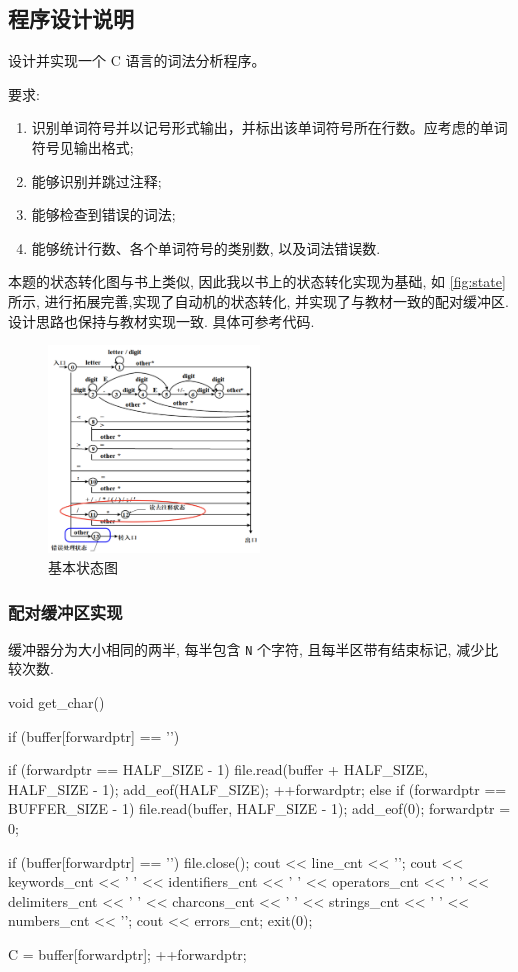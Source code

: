 \subsection{程序设计说明}

设计并实现一个 C 语言的词法分析程序。

要求: \begin{enumerate}
    \item 识别单词符号并以记号形式输出，并标出该单词符号所在行数。应考虑的单词符号见输出格式;
    \item 能够识别并跳过注释;
    \item 能够检查到错误的词法;
    \item 能够统计行数、各个单词符号的类别数, 以及词法错误数.
\end{enumerate}

本题的状态转化图与书上类似, 因此我以书上的状态转化实现为基础, 如 \autoref{fig:state} 所示, 进行拓展完善,实现了自动机的状态转化, 并实现了与教材一致的配对缓冲区. 设计思路也保持与教材实现一致. 具体可参考代码. \begin{figure}[htbp]
    \centering
    \includegraphics[width=0.5\textwidth]{images/state.png}
    \caption{基本状态图}
    \label{fig:state}
\end{figure}

\subsubsection{配对缓冲区实现}
缓冲器分为大小相同的两半, 每半包含 \texttt{N} 个字符, 且每半区带有结束标记, 减少比较次数.
\begin{cppcode}
void get_char()
{
    if (buffer[forwardptr] == '\0') {
        if (forwardptr == HALF_SIZE - 1) {
            file.read(buffer + HALF_SIZE, HALF_SIZE - 1);
            add_eof(HALF_SIZE);
            ++forwardptr;
        } else if (forwardptr == BUFFER_SIZE - 1) {
            file.read(buffer, HALF_SIZE - 1);
            add_eof(0);
            forwardptr = 0;
        }

        if (buffer[forwardptr] == '\0') {
            file.close();
            cout << line_cnt << '\n';
            cout << keywords_cnt << ' ' << identifiers_cnt << ' ' << operators_cnt << ' ' << delimiters_cnt << ' ' << charcons_cnt << ' ' << strings_cnt << ' ' << numbers_cnt << '\n';
            cout << errors_cnt;
            exit(0);
        }
    }
    C = buffer[forwardptr];
    ++forwardptr;
}
\end{cppcode}

